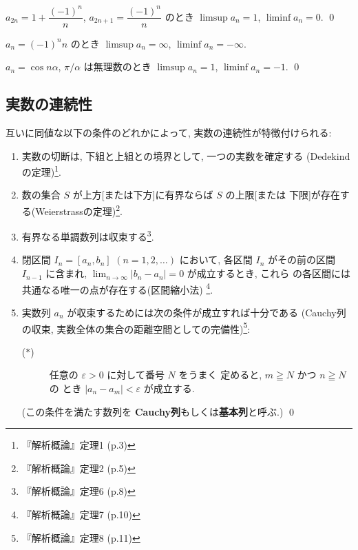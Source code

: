 \documentclass[12pt,twoside]{jarticle}
\begin{document}
\begin{question}
 $a_{2n}=1+\dfrac{(-1)^n}{n}$, $a_{2n+1}=\dfrac{(-1)^n}{n}$ のとき %
 $\limsup a_n=1$, $\liminf a_n=0$.
 \qed
\end{question}

\begin{question}
 $a_n=(-1)^n n$ のとき $\limsup a_n=\infty$, $\liminf a_n=-\infty$.
\end{question}

\begin{question}
 $a_n=\cos n\alpha$, $\pi/\alpha$ は無理数のとき %
 $\limsup a_n=1$, $\liminf a_n=-1$.
 \qed
\end{question}


\subsection{実数の連続性}

\begin{theorem}[実数の連続性]
  互いに同値な以下の条件のどれかによって, 実数の連続性が特徴付けられる:
  \begin{enumerate}
  \item 実数の切断は, 下組と上組との境界として, 一つの実数を確定する
    (Dedekindの定理)\footnote{『解析概論』\cite{takagi}定理1 (p.3)}.
  \item 数の集合 $S$ が上方[または下方]に有界ならば $S$ の上限[または
    下限]が存在する(Weierstrassの定理)\footnote{『解析概論』\cite{takagi}定理2 (p.5)}.
  \item 有界なる単調数列は収束する\footnote{『解析概論』\cite{takagi}定理6 (p.8)}.
  \item 閉区間 $I_n=[a_n,b_n]$ $(n=1,2,\ldots)$ において, 各区間 $I_n$ 
    がその前の区間 $I_{n-1}$ に含まれ,
    $\displaystyle\lim_{n\to\infty}|b_n-a_n|=0$ が成立するとき, これら
    の各区間には共通なる唯一の点が存在する(区間縮小法)%
    \footnote{『解析概論』\cite{takagi}定理7 (p.10)}.
  \item 実数列 $a_n$ が収束するためには次の条件が成立すれば十分である
    (Cauchy列の収束, 実数全体の集合の距離空間としての完備性)\footnote
    {『解析概論』\cite{takagi}定理8 (p.11)}:
    \begin{description}
    \item[($\ast$)] 任意の $\varepsilon > 0$ に対して番号 $N$ をうまく
      定めると, $m \geqq N$ かつ $n \geqq N$ の
      とき $|a_n - a_m| < \varepsilon$ が成立する.
    \end{description}
    (この条件を満たす数列を
    {\bf Cauchy列}もしくは{\bf 基本列}と呼ぶ.)
    \qed
  \end{enumerate}
\end{theorem}
\end{document}
